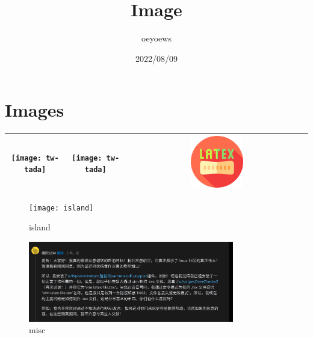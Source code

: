 \documentclass{article}
\title{Image \emoji{book}}
\author{oeyoews}
\date{2022/08/09}
\begin{document}
\maketitle

\section{ Images}
\label{sec:img}

\begin{table}
\begin{tabular}{|c|c|c|}\hline
	\texttt{[image: tw-tada]} & \texttt{[image: tw-tada]} & \includegraphics[width=0.3\textwidth]{latex} \\\hline
\end{tabular}
\end{table}

\begin{figure}[htpb]
  \centering
  \texttt{[image: island]}
  \caption{island}
  \label{fig:island}
\end{figure}

\begin{figure}[htpb]
  \centering
  \includegraphics[width=0.8\textwidth]{misc}
  \caption{misc}
  \label{fig:misc}
\end{figure}
\end{document}
